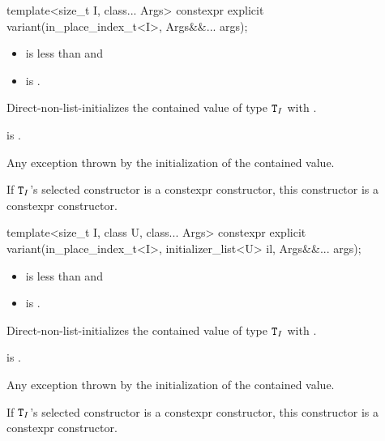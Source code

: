 %
\begin{itemdecl}
template<size_t I, class... Args> constexpr explicit variant(in_place_index_t<I>, Args&&... args);
\end{itemdecl}

\begin{itemdescr}
\pnum
\constraints
\begin{itemize}
\item
{} is less than  and
\item
{} is .
\end{itemize}

\pnum
\effects
Direct-non-list-initializes the contained value of type $\tcode{T}_I$
with .

\pnum
\ensures
{} is .

\pnum
\throws
Any exception thrown by
the initialization of the contained value.

\pnum
\remarks
If $\tcode{T}_I$'s selected constructor is a constexpr constructor, this
constructor is a constexpr constructor.
\end{itemdescr}

%
\begin{itemdecl}
template<size_t I, class U, class... Args>
  constexpr explicit variant(in_place_index_t<I>, initializer_list<U> il, Args&&... args);
\end{itemdecl}

\begin{itemdescr}
\pnum
\constraints
\begin{itemize}
\item
{} is less than  and
\item
{} is .
\end{itemize}

\pnum
\effects
Direct-non-list-initializes the contained value of type $\tcode{T}_I$
with .

\pnum
\ensures
{} is .

\pnum
\throws
Any exception thrown by
the initialization of the contained value.

\pnum
\remarks
If $\tcode{T}_I$'s selected constructor is a constexpr constructor, this
constructor is a constexpr constructor.
\end{itemdescr}

